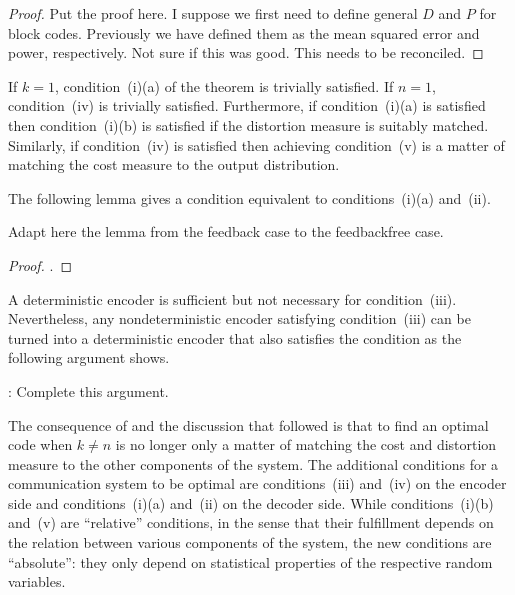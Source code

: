 \begin{proof}
  Put the proof here. I suppose we first need to define general $D$ and $P$ for
  block codes. Previously we have defined them as the mean squared error and
  power, respectively. Not sure if this was good. This needs to be reconciled.
\end{proof}

\begin{discussion}
  If $k = 1$, condition~(i)(a) of the theorem is trivially satisfied. If $n =
  1$, condition~(iv) is trivially satisfied. Furthermore, if condition~(i)(a) is
  satisfied then condition~(i)(b) is satisfied if the distortion measure is
  suitably matched. Similarly, if condition~(iv) is satisfied then achieving
  condition~(v) is a matter of matching the cost measure to the output
  distribution. 
\end{discussion}

The following lemma gives a condition equivalent to conditions~(i)(a) and~(ii).
\begin{lemma}
  \label{lem:ssil}
  Adapt here the lemma from the feedback case to the feedbackfree case.
\end{lemma}
\begin{proof}
  \todo.
\end{proof}

\begin{remark}
  \label{rem:inflosslessenc}
  A deterministic encoder is sufficient but not necessary for condition~(iii).
  Nevertheless, any nondeterministic encoder satisfying condition~(iii) can be
  turned into a deterministic encoder that also satisfies the condition as the
  following argument shows. 

  \todo: Complete this argument.
\end{remark}

The consequence of  and the discussion that followed is that
to find an optimal code when $k \ne n$ is no longer only a matter of matching
the cost and distortion measure to the other components of the system.  The
additional conditions for a communication system to be optimal are
conditions~(iii) and~(iv) on the encoder side and conditions~(i)(a) and~(ii) on
the decoder side.  While conditions~(i)(b) and~(v) are ``relative'' conditions,
in the sense that their fulfillment depends on the relation between various
components of the system, the new conditions are ``absolute'': they only depend
on statistical properties of the respective random variables.

